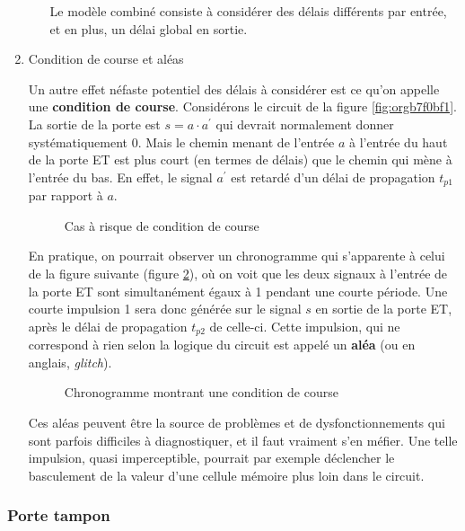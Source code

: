 \documentclass[11pt]{article}
\begin{document}
\begin{enumerate}
\begin{enumerate}
Le modèle combiné consiste à considérer des délais différents par
entrée, et en plus, un délai global en sortie.
\end{enumerate}

\item Condition de course et aléas
\label{sec:org202ae12}

Un autre effet néfaste potentiel des délais à considérer est ce qu'on
appelle une \textbf{condition de course}. Considérons le circuit de la figure
\ref{fig:orgb7f0bf1}.  La sortie de la porte est \(s = a \cdot a^\prime\) qui
devrait normalement donner systématiquement 0. Mais le chemin menant
de l'entrée \(a\) à l'entrée du haut de la porte ET est plus court (en
termes de délais) que le chemin qui mène à l'entrée du bas. En effet,
le signal \(a^\prime\) est retardé d'un délai de propagation
\(t_{p1}\) par rapport à \(a\).

\begin{figure}[htbp]
\centering

\caption{\label{fig:org99b1d98}Cas à risque de condition de course}
\end{figure}

En pratique, on pourrait observer un chronogramme qui s'apparente à
celui de la figure suivante (figure \ref{fig:orgc2c5b98}), où on voit
que les deux signaux à l'entrée de la porte ET sont simultanément
égaux à 1 pendant une courte période. Une courte impulsion 1 sera donc
générée sur le signal \(s\) en sortie de la porte ET, après le délai
de propagation \(t_{p2}\) de celle-ci. Cette impulsion, qui ne
correspond à rien selon la logique du circuit est appelé un \textbf{aléa} (ou
en anglais, \emph{glitch}).

\begin{figure}[htbp]
\centering

\caption{\label{fig:orgc2c5b98}Chronogramme montrant une condition de course}
\end{figure}

Ces aléas peuvent être la source de problèmes et de dysfonctionnements
qui sont parfois difficiles à diagnostiquer, et il faut vraiment s'en
méfier. Une telle impulsion, quasi imperceptible, pourrait par exemple
déclencher le basculement de la valeur d'une cellule mémoire plus loin
dans le circuit.
\end{enumerate}

\subsubsection{Porte tampon}
\label{sec:org92c2dfe}
\end{document}

